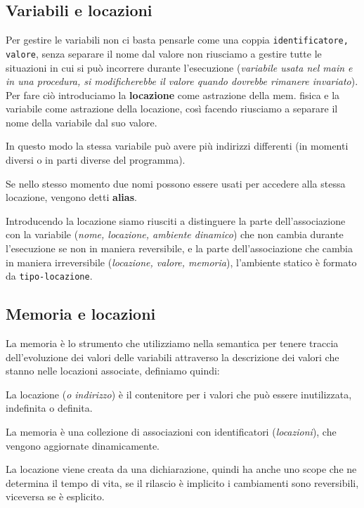 \documentclass[oneside,a4paper,11pt]{book}
\theoremstyle{italicstyle}
\theoremstyle{normStyle}
\begin{document}
\subsection{Variabili e locazioni}
Per gestire le variabili non ci basta pensarle come una coppia \verb|identificatore, valore|,
senza separare
il nome dal valore non riusciamo a gestire tutte le situazioni in cui
si può incorrere durante l’esecuzione (\textit{variabile usata nel main e in una procedura,
si modificherebbe il valore quando dovrebbe rimanere invariato}). Per
fare ciò introduciamo la \textbf{locazione} come astrazione della mem. fisica e
la variabile come astrazione della locazione, così facendo riusciamo a
separare il nome della variabile dal suo valore.

In questo modo la stessa variabile può avere più indirizzi differenti
(in momenti diversi o in parti diverse del programma).

Se nello stesso momento due nomi possono essere usati per accedere alla
stessa locazione, vengono detti \textbf{alias}.

Introducendo la locazione siamo riusciti a distinguere la parte
dell’associazione con la variabile (\textit{nome, locazione, ambiente dinamico}) che
non cambia durante l’esecuzione se non in maniera reversibile, e la parte
dell’associazione che cambia in maniera irreversibile (\textit{locazione, valore, memoria}),
l’ambiente statico è formato da \verb|tipo-locazione|.

\subsection{Memoria e locazioni}
La memoria è lo strumento che utilizziamo nella semantica per tenere traccia dell'evoluzione 
dei valori delle variabili attraverso la descrizione dei valori che stanno nelle locazioni associate, definiamo 
quindi:
\begin{tcolorbox}[title = {Locazione/indirizzo}]
  La locazione (\textit{o indirizzo}) è il contenitore per i valori che può essere 
  inutilizzata, indefinita o definita.
\end{tcolorbox}
\begin{tcolorbox}[title = {Memoria}]
  La memoria è una collezione di associazioni con identificatori (\textit{locazioni}), 
  che vengono aggiornate dinamicamente.
\end{tcolorbox}
La locazione viene creata da una dichiarazione, quindi ha anche uno scope che ne determina il tempo di vita,
se il rilascio è implicito i cambiamenti sono reversibili, viceversa se è esplicito.
\end{document}
